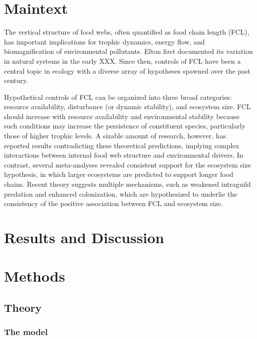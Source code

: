 \documentclass[11pt, class=article, crop=false]{standalone}
\begin{document}
\section{Maintext}

The vertical structure of food webs, often quantified as food chain length (FCL), has important implications for trophic dynamics, energy flow, and biomagnification of environmental pollutants.
Elton first documented its variation in natural systems in the early XXX.
Since then, controls of FCL have been a central topic in ecology with a diverse array of hypotheses spawned over the past century.

Hypothetical controls of FCL can be organized into three broad categories: resource availability, disturbance (or dynamic stability), and ecosystem size.
FCL should increase with resource availability and environmental stability because such conditions may increase the persistence of constituent species, particularly those of higher trophic levels.
A sizable amount of research, however, has reported results contradicting these theoretical predictions, implying complex interactions between internal food web structure and environmental drivers.
In contrast, several meta-analyses revealed consistent support for the ecosystem size hypothesis, in which larger ecosystems are predicted to support longer food chains.
Recent theory suggests multiple mechanisms, such as weakened intraguild predation and enhanced colonization, which are hypothesized to underlie the consistency of the positive association between FCL and ecosystem size.


\section{Results and Discussion}

\section{Methods}

\subsection{Theory}

\subsubsection{The model}
\end{document}
